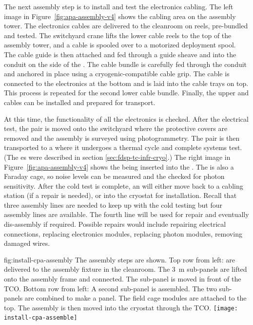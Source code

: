 The next assembly step is to install and test the electronics cabling.  The left image in Figure~\ref{fig:apa-assembly-v4} shows the  cabling area on the  assembly tower. 
The electronics cables are delivered to the cleanroom on reels,  pre-bundled and tested. 
The switchyard crane lifts the lower  cable reels to the top of the assembly tower, and a cable is spooled over to a motorized deployment spool. 
The cable guide is then attached and fed through a guide sheave and into the conduit on the side of the . 
The cable bundle is carefully fed through the conduit and anchored in place using a cryogenic-compatible cable grip. 
The cable is connected to the electronics at the bottom and is laid into the cable trays on top. This process is repeated for the second lower  cable bundle. 
Finally, the upper  and  cables can be installed and prepared for transport.

At this time, the functionality of all the electronics is checked. 
After the  electrical test, the  pair is moved onto the switchyard where the protective covers are removed and the assembly is surveyed using photogrammetry. 
The  pair is then transported to a \coldbox where it undergoes a thermal cycle and complete systems test. (The \coldbox{}es were described in section \ref{sec:fdsp-tc-infr-cryo}.)
The right image in Figure~\ref{fig:apa-assembly-v4} shows the  being inserted into the \coldbox. The \coldbox is also a Faraday cage, so noise levels can be measured and the  checked for photon sensitivity. 
After the cold test is complete, an  will either move back to a cabling station (if a repair is needed), or into the cryostat for installation. Recall that three assembly lines are needed to keep up with the cold testing but four assembly lines are available. The fourth line will be used for repair and eventually dis-assembly if required. Possible repairs would include repairing electrical connections, replacing electronics modules, replacing photon modules, removing damaged  wires. 


\begin{dunefigure}{fig:install-cpa-assembly}
  {The  assembly steps are shown. Top row from left:   are delivered to the  assembly fixture in the cleanroom. The \SI{3}{m} sub-panels are lifted onto the assembly frame and connected. The  sub-panel is moved in front of the TCO. Bottom row from left: A second sub-panel is assembled. The two sub-panels are combined to make a  panel. The field cage modules are attached to the top. The assembly is then moved into the cryostat through the TCO.}
\texttt{[image: install-cpa-assemble]}
\end{dunefigure}

